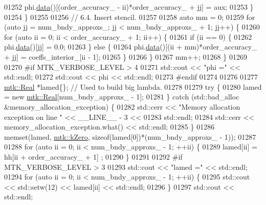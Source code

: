\begin{DoxyCode}
{{01252         phi.\hyperlink{classmtk_1_1DenseMatrix_a0c33b8a9e01d157c61ddbdf807c25d84}{data}()[(order\_accuracy\_ - ii)*order\_accuracy\_ + jj] = aux;
01253       \}
01254     \}
01255 
01256     \textcolor{comment}{// 6.4. Insert stencil.}
01257 
01258     \textcolor{keyword}{auto} mm = 0;
01259     \textcolor{keywordflow}{for} (\textcolor{keyword}{auto} jj = num\_bndy\_approxs\_; jj < num\_bndy\_approxs\_ +  1; jj++) \{
01260       \textcolor{keywordflow}{for} (\textcolor{keyword}{auto} ii = 0; ii < order\_accuracy\_ + 1; ii++) \{
01261         \textcolor{keywordflow}{if} (ii == 0) \{
01262           phi.\hyperlink{classmtk_1_1DenseMatrix_a0c33b8a9e01d157c61ddbdf807c25d84}{data}()[jj] = 0.0;
01263         \} \textcolor{keywordflow}{else} \{
01264           phi.\hyperlink{classmtk_1_1DenseMatrix_a0c33b8a9e01d157c61ddbdf807c25d84}{data}()[(ii + mm)*order\_accuracy\_ + jj] = coeffs\_interior\_[ii - 1];
01265         \}
01266       \}
01267       mm++;
01268     \}
01269 
01270 \textcolor{preprocessor}{    #if MTK\_VERBOSE\_LEVEL > 4}
01271     std::cout << \textcolor{stringliteral}{"phi ="} << std::endl;
01272     std::cout << phi << std::endl;
01273 \textcolor{preprocessor}{    #endif}
01274 
01276 
01277     \hyperlink{group__c01-roots_gac080bbbf5cbb5502c9f00405f894857d}{mtk::Real} *lamed\{\};  \textcolor{comment}{// Used to build big lambda.}
01278 
01279     \textcolor{keywordflow}{try} \{
01280       lamed = \textcolor{keyword}{new} \hyperlink{group__c01-roots_gac080bbbf5cbb5502c9f00405f894857d}{mtk::Real}[num\_bndy\_approxs\_ - 1];
01281     \} \textcolor{keywordflow}{catch} (std::bad\_alloc &memory\_allocation\_exception) \{
01282       std::cerr << \textcolor{stringliteral}{"Memory allocation exception on line "} << \_\_LINE\_\_ - 3 <<
01283         std::endl;
01284       std::cerr << memory\_allocation\_exception.what() << std::endl;
01285     \}
01286     memset(lamed, \hyperlink{group__c01-roots_ga59a451a5fae30d59649bcda274fea271}{mtk::kZero}, \textcolor{keyword}{sizeof}(lamed[0])*(num\_bndy\_approxs\_ - 1));
01287 
01288     \textcolor{keywordflow}{for} (\textcolor{keyword}{auto} ii = 0; ii < num\_bndy\_approxs\_ - 1; ++ii) \{
01289       lamed[ii] = hh[ii + order\_accuracy\_ + 1] ;
01290     \}
01291 
01292 \textcolor{preprocessor}{    #if MTK\_VERBOSE\_LEVEL > 3}
01293     std::cout << \textcolor{stringliteral}{"lamed ="} << std::endl;
01294     \textcolor{keywordflow}{for} (\textcolor{keyword}{auto} ii = 0; ii < num\_bndy\_approxs\_ - 1; ++ii) \{
01295       std::cout << std::setw(12) << lamed[ii] << std::endl;
01296     \}
01297     std::cout << std::endl;
}}
\end{DoxyCode}
